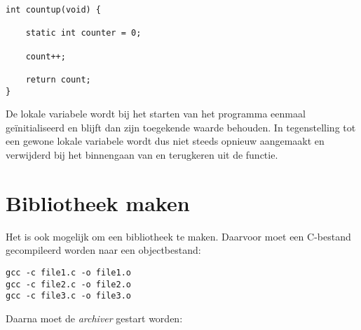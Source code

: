 \begin{lstlisting}[caption=Gebruik van een static lokale variabele.,label=cod:comstaticloc]
int countup(void) {

    static int counter = 0;
    
    count++;
    
    return count;
}
\end{lstlisting}

De lokale variabele  wordt bij het starten van het programma eenmaal geïnitialiseerd en blijft dan zijn toegekende waarde behouden. In tegenstelling tot een gewone lokale variabele wordt  dus niet steeds opnieuw aangemaakt en verwijderd bij het binnengaan van en terugkeren uit de functie.





\section{Bibliotheek maken}
Het is ook mogelijk om een bibliotheek te maken. Daarvoor moet een C-bestand gecompileerd worden naar een objectbestand:

\hspace*{1em}\texttt{gcc -c file1.c -o file1.o}\\
\hspace*{1em}\texttt{gcc -c file2.c -o file2.o}\\
\hspace*{1em}\texttt{gcc -c file3.c -o file3.o}

Daarna moet de \textsl{archiver} gestart worden:

